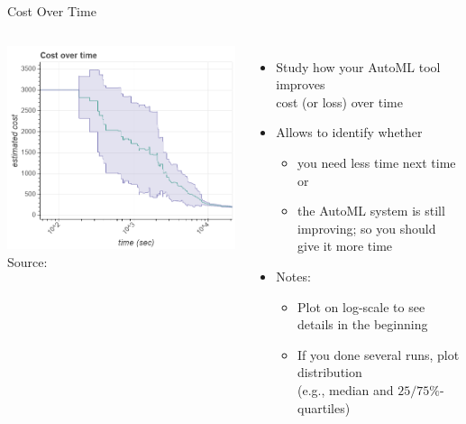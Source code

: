 \begin{frame}[c]{Cost Over Time}

\begin{columns}

\begin{center}
	\includegraphics[width=1.0\textwidth]{images/overtime_plot.png}\\
	Source: 
\end{center}


\begin{itemize}
	\item Study how your AutoML tool improves\\ cost (or loss) over time
	\pause
	\item Allows to identify whether 
	\begin{itemize}
		\item you need less time next time or 
		\pause
		\item the AutoML system is still improving; so you should give it more time
	\end{itemize}
	\pause
	\item \alert{Notes}: 
	\begin{itemize}
		\item Plot on log-scale to see details in the beginning
		\item  If you done several runs, plot distribution\\ (e.g., median and $25/75\%$-quartiles)
	\end{itemize}
\end{itemize}
	
\end{columns}

\end{frame}

